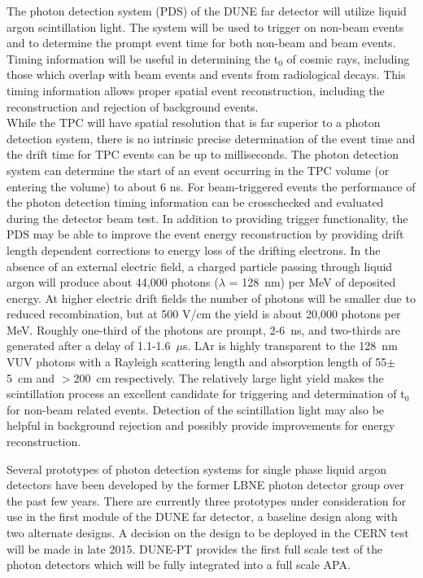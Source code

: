 



The photon detection system (PDS) of the DUNE far detector will utilize liquid argon scintillation light.  The system will be used to trigger on non-beam events and to determine the prompt event time for both non-beam and beam events. 
Timing information will be useful in determining the t$_0$ of cosmic rays, including those which 
overlap with beam events and events from radiological decays. This timing information allows proper spatial event reconstruction, including 
the reconstruction and rejection of background events.\\
%
While the TPC will have spatial resolution that is far superior to a photon detection system, there is no intrinsic precise determination of the event time and the drift time for TPC events can be up to milliseconds. The photon detection system can determine the start of an event occurring in the TPC volume (or entering the volume) to about 6 ns. For beam-triggered events the performance of the photon detection timing information can be crosschecked and evaluated during the detector beam test. In addition to providing trigger functionality, the PDS may be able to improve the event energy reconstruction by providing drift length dependent corrections to energy loss of the drifting electrons.
In the absence of an external electric field, a charged particle passing through liquid argon will produce about 44,000 photons ($\lambda$ = 128~nm) per MeV of deposited energy. 
At higher electric drift fields the number of photons will be smaller due to reduced recombination, but at 500 V/cm the yield is about 20,000 photons per MeV. Roughly one-third of the photons are prompt, 2-6~ns, and two-thirds are generated after a delay of 1.1-1.6~$\mu$s. LAr is highly transparent to the 128~nm VUV photons with a Rayleigh scattering length and absorption length of 55$\pm$5~cm \cite{rayleigh} and $>$200~cm \cite{absorption} respectively. The relatively large light yield makes the scintillation process an excellent candidate for triggering and  determination of t$_0$ for non-beam related events. Detection of the scintillation light may also be helpful in background rejection and possibly
provide improvements for energy reconstruction.

Several prototypes of photon detection systems for single phase liquid argon detectors have been developed by the former LBNE photon detector group over the past few years. There are currently three prototypes under consideration for use in the first module of the DUNE far detector, a baseline design along with two alternate designs. A decision on the design to be deployed in the CERN test will be made in late 2015. 
DUNE-PT provides the first full scale test of the photon detectors which will be fully integrated into a 
full scale APA. 

